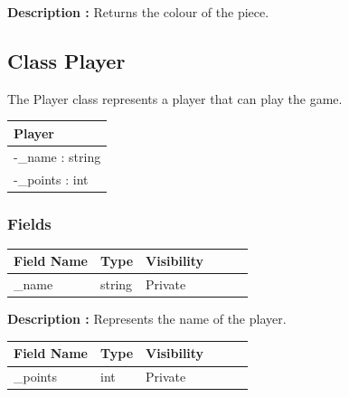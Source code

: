 \documentclass[12pt]{article}
\begin{document}
    \textbf{Description :} Returns the colour of the piece.

    \newpage


    \subsection{Class Player}

    The Player class represents a player that can play the game.

    \begin{table}[H]
        \begin{tabular}{|l|}
            \hline
            \rowcolor[HTML]{C0C0C0}
            \textbf{Player}  \\ \hline
            \rowcolor[HTML]{EFEFEF}
            -\_name : string \\ \hline
            -\_points : int  \\ \hline
        \end{tabular}
    \end{table}

    \subsubsection{Fields}

    \begin{table}[H]
        \begin{tabular}{llllll}
            \hline
            \multicolumn{1}{|l|}{\cellcolor[HTML]{EFEFEF}\textbf{Field Name}} & \multicolumn{1}{l|}{\cellcolor[HTML]{EFEFEF}\textbf{Type}} & \multicolumn{1}{l|}{\cellcolor[HTML]{EFEFEF}\textbf{Visibility}} \\ \hline
            \multicolumn{1}{|l|}{\_name}                                      & \multicolumn{1}{l|}{string}                                & \multicolumn{1}{l|}{Private}                                     \\ \hline
        \end{tabular}
    \end{table}

    \textbf{Description :} Represents the name of the player.

    \begin{table}[H]
        \begin{tabular}{llllll}
            \hline
            \multicolumn{1}{|l|}{\cellcolor[HTML]{EFEFEF}\textbf{Field Name}} & \multicolumn{1}{l|}{\cellcolor[HTML]{EFEFEF}\textbf{Type}} & \multicolumn{1}{l|}{\cellcolor[HTML]{EFEFEF}\textbf{Visibility}} \\ \hline
            \multicolumn{1}{|l|}{\_points}                                    & \multicolumn{1}{l|}{int}                                   & \multicolumn{1}{l|}{Private}                                     \\ \hline
        \end{tabular}
    \end{table}
\end{document}
